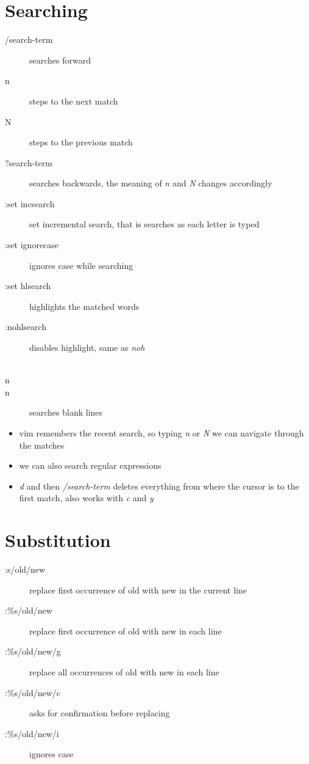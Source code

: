 \documentclass[a4paper, 12pt]{article}
\begin{document}
\section{Searching}
\begin{description}
	\item[/search-term] searches forward
	\item[n] steps to the next match
	\item[N] steps to the previous match
	\item[?search-term] searches backwards, the meaning of \emph{n} and \emph{N} changes accordingly
	\item[:set incsearch] set incremental search, that is searches as each letter is typed
	\item[:set ignorecase] ignores case while searching
	\item[:set hlsearch] highlights the matched words
	\item[:nohlsearch] disables highlight, same as \emph{noh}
	\item[\\n\\n] searches blank lines
\end{description}

\begin{itemize}
	\item vim remembers the recent search, so typing \emph{n} or \emph{N} we can navigate through the matches 
	\item we can also search regular expressions
	\item \emph{d} and then \emph{/search-term} deletes everything from where the cursor is to the first match, also works with \emph{c} and \emph{y}
\end{itemize}

\section{Substitution}
\begin{description}
	\item[:s/old/new] replace first occurrence of old with new in the current line 
	\item[:\%s/old/new] replace first occurrence of old with new in each line
	\item[:\%s/old/new/g] replace all occurrences of old with new in each line
	\item[:\%s/old/new/c] asks for confirmation before replacing
	\item[:\%s/old/new/i] ignores case
\end{description}
\end{document}
